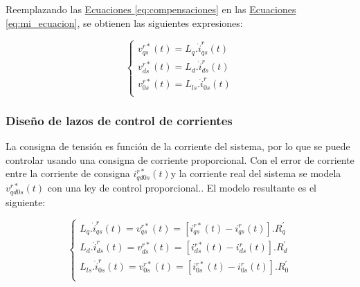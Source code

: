 \documentclass{article}
\begin{document}
Reemplazando las \hyperref[eq:compensaciones]{Ecuaciones \ref*{eq:compensaciones}} en las
\hyperref[eq:mi_ecuacion]{Ecuaciones \ref*{eq:mi_ecuacion}}, se obtienen las siguientes expresiones:

\begin{equation}\label{eq:proporcionlaidad_corrientes_tensiones_de_entrada}
    \begin{cases}
        v^{r*}_{qs}(t) = L_q. \dot{i}_{qs}^r(t) \\
        v^{r*}_{ds}(t) = L_d. \dot{i}_{ds}^r(t) \\
        v^{r*}_{0s}(t) = L_{ls}. \dot{i}_{0s}^r(t) \\
    \end{cases}
\end{equation}




\subsubsection{Diseño de lazos de control de corrientes}

La consigna de tensión es función de la corriente del sistema, por lo que se puede controlar usando 
una consigna de corriente proporcional. Con el error de corriente entre la corriente de consigna 
$i_{qd0s}^{r*}(t)$y la corriente real del sistema se modela $v_{qd0s}^{r*}(t)$ con una ley de 
control proporcional.. El modelo resultante es el siguiente:

\begin{equation}
    \begin{cases}
        L_q. \dot{i}_{qs}^r(t) = v^{r*}_{qs}(t) = [i_{qs}^{r*}(t) - i_{qs}^r(t)].R_q^\prime \\
        L_d. \dot{i}_{ds}^r(t) = v^{r*}_{ds}(t) = [i_{ds}^{r*}(t) - i_{ds}^r(t)].R_d^\prime \\
        L_{ls}. \dot{i}_{0s}^r(t) = v^{r*}_{0s}(t) = [i_{0s}^{r*}(t) - i_{0s}^r(t)].R_{0}^\prime \\
    \end{cases}
\end{equation}
\end{document}
